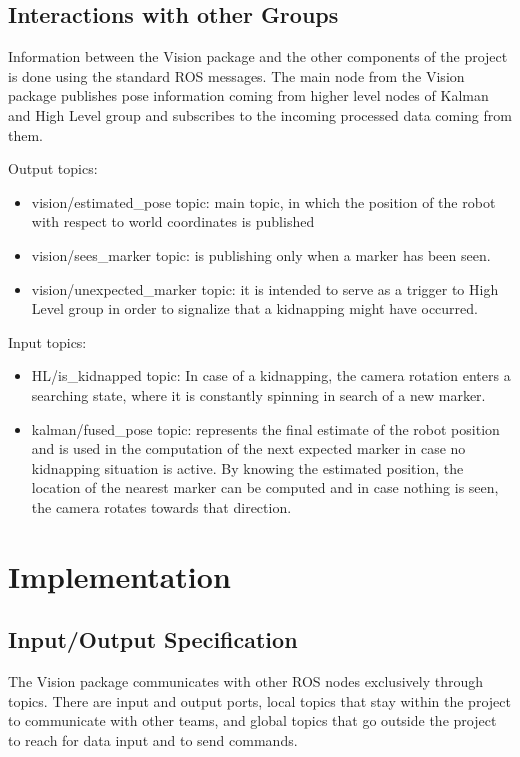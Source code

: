 \subsection{Interactions with other Groups}
Information between the Vision package and the other components of the project is done using the standard ROS messages. The main node from the Vision package publishes pose information coming from higher level nodes of Kalman and High Level group and subscribes to the incoming processed data coming from them.

\begin{description}
\item Output topics:
\begin{itemize}
\item vision/estimated\_pose topic: main topic, in which the position of the robot with respect to world coordinates is published
\item vision/sees\_marker topic: is publishing only when a marker has been seen. 
\item vision/unexpected\_marker  topic: it is intended to serve as a trigger to High Level group in order to signalize that a kidnapping might have occurred.
\end{itemize}
\item Input topics:
\begin{itemize}
\item HL/is\_kidnapped topic: In case of a kidnapping, the camera rotation enters a searching state, where it is constantly spinning in search of a new marker.
\item kalman/fused\_pose topic: represents the final estimate of the robot position and is used in the computation of the next expected marker in case no kidnapping situation is active. By knowing the estimated position, the location of the nearest marker can be computed and in case nothing is seen, the camera rotates towards that direction.
\end{itemize}
\end{description}

\section{Implementation}

\subsection{Input/Output Specification}
The Vision package communicates with other ROS nodes exclusively through topics. There are input and output ports, local topics that stay within the project to communicate with other teams, and global topics that go outside the project to reach for data input and to send commands.

